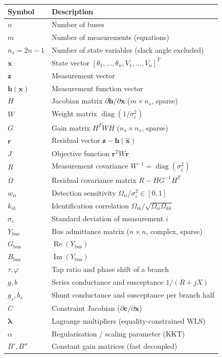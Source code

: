 \documentclass[11pt,a4paper]{article}
\begin{document}
\begin{center}
\small
\begin{tabular}{lp{72mm}}
  \toprule
  \textbf{Symbol} & \textbf{Description} \\
  \midrule
  $n$              & Number of buses \\
  $m$              & Number of measurements (equations) \\
  $n_s = 2n{-}1$  & Number of state variables (slack angle excluded) \\
  $\mathbf{x}$    & State vector $[\theta_1,\ldots,\theta_n,V_1,\ldots,V_n]^T$ \\
  $\mathbf{z}$    & Measurement vector \\
  $\mathbf{h}(\mathbf{x})$ & Measurement function vector \\
  $H$              & Jacobian matrix $\partial\mathbf{h}/\partial\mathbf{x}$
                     ($m \times n_s$, sparse) \\
  $W$              & Weight matrix $\operatorname{diag}(1/\sigma_i^2)$ \\
  $G$              & Gain matrix $H^TWH$ ($n_s \times n_s$, sparse) \\
  $\mathbf{r}$    & Residual vector $\mathbf{z} - \mathbf{h}(\hat{\mathbf{x}})$ \\
  $J$              & Objective function $\mathbf{r}^TW\mathbf{r}$ \\
  $R$              & Measurement covariance $W^{-1} = \operatorname{diag}(\sigma_i^2)$ \\
  $\Omega$         & Residual covariance matrix $R - HG^{-1}H^T$ \\
  $w_{ii}$         & Detection sensitivity $\Omega_{ii}/\sigma_i^2 \in [0,1]$ \\
  $k_{ik}$         & Identification correlation
                     $\Omega_{ik}/\sqrt{\Omega_{ii}\Omega_{kk}}$ \\
  $\sigma_i$       & Standard deviation of measurement $i$ \\
  $Y_\text{bus}$   & Bus admittance matrix ($n \times n$, complex, sparse) \\
  $G_\text{bus}$   & $\operatorname{Re}(Y_\text{bus})$ \\
  $B_\text{bus}$   & $\operatorname{Im}(Y_\text{bus})$ \\
  $\tau, \varphi$  & Tap ratio and phase shift of a branch \\
  $g, b$           & Series conductance and susceptance $1/(R{+}jX)$ \\
  $g_s, b_s$       & Shunt conductance and susceptance per branch half \\
  $C$              & Constraint Jacobian ($\partial\mathbf{c}/\partial\mathbf{x}$) \\
  $\bm{\lambda}$   & Lagrange multipliers (equality-constrained WLS) \\
  $\alpha$         & Regularisation / scaling parameter (KKT) \\
  $B', B''$        & Constant gain matrices (fast decoupled) \\
  \bottomrule
\end{tabular}
\end{center}
\end{document}
